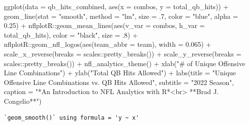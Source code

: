 \documentclass[
  letterpaper,
]{krantz}
\newenvironment{Shaded}{\begin{snugshade}}{\end{snugshade}}
\newcommand{\AttributeTok}[1]{\textcolor[rgb]{0.40,0.45,0.13}{#1}}
\newcommand{\DecValTok}[1]{\textcolor[rgb]{0.68,0.00,0.00}{#1}}
\newcommand{\FloatTok}[1]{\textcolor[rgb]{0.68,0.00,0.00}{#1}}
\newcommand{\FunctionTok}[1]{\textcolor[rgb]{0.28,0.35,0.67}{#1}}
\newcommand{\NormalTok}[1]{\textcolor[rgb]{0.00,0.23,0.31}{#1}}
\newcommand{\SpecialCharTok}[1]{\textcolor[rgb]{0.37,0.37,0.37}{#1}}
\newcommand{\StringTok}[1]{\textcolor[rgb]{0.13,0.47,0.30}{#1}}
\begin{document}
\begin{Shaded}
\begin{Highlighting}[]
\FunctionTok{ggplot}\NormalTok{(}\AttributeTok{data =}\NormalTok{ qb\_hits\_combined, }\FunctionTok{aes}\NormalTok{(}\AttributeTok{x =}\NormalTok{ combos, }\AttributeTok{y =}\NormalTok{ total\_qb\_hits)) }\SpecialCharTok{+}
    \FunctionTok{geom\_line}\NormalTok{(}\AttributeTok{stat =} \StringTok{"smooth"}\NormalTok{, }\AttributeTok{method =} \StringTok{"lm"}\NormalTok{,}
              \AttributeTok{size =}\NormalTok{ .}\DecValTok{7}\NormalTok{, }\AttributeTok{color =} \StringTok{"blue"}\NormalTok{,}
              \AttributeTok{alpha =} \FloatTok{0.25}\NormalTok{) }\SpecialCharTok{+}
\NormalTok{  nflplotR}\SpecialCharTok{::}\FunctionTok{geom\_mean\_lines}\NormalTok{(}\FunctionTok{aes}\NormalTok{(}\AttributeTok{v\_var =}\NormalTok{ combos, }\AttributeTok{h\_var =}\NormalTok{ total\_qb\_hits),}
                            \AttributeTok{color =} \StringTok{"black"}\NormalTok{, }\AttributeTok{size =}\NormalTok{ .}\DecValTok{8}\NormalTok{) }\SpecialCharTok{+}
\NormalTok{  nflplotR}\SpecialCharTok{::}\FunctionTok{geom\_nfl\_logos}\NormalTok{(}\FunctionTok{aes}\NormalTok{(}\AttributeTok{team\_abbr =}\NormalTok{ team), }\AttributeTok{width =} \FloatTok{0.065}\NormalTok{) }\SpecialCharTok{+}
  \FunctionTok{scale\_x\_reverse}\NormalTok{(}\AttributeTok{breaks =}\NormalTok{ scales}\SpecialCharTok{::}\FunctionTok{pretty\_breaks}\NormalTok{()) }\SpecialCharTok{+}
  \FunctionTok{scale\_y\_reverse}\NormalTok{(}\AttributeTok{breaks =}\NormalTok{ scales}\SpecialCharTok{::}\FunctionTok{pretty\_breaks}\NormalTok{()) }\SpecialCharTok{+}
  \FunctionTok{nfl\_analytics\_theme}\NormalTok{() }\SpecialCharTok{+}
  \FunctionTok{xlab}\NormalTok{(}\StringTok{"\# of Unique Offensive Line Combinations"}\NormalTok{) }\SpecialCharTok{+}
  \FunctionTok{ylab}\NormalTok{(}\StringTok{"Total QB Hits Allowed"}\NormalTok{) }\SpecialCharTok{+}
  \FunctionTok{labs}\NormalTok{(}\AttributeTok{title =} \StringTok{"Unique Offensive Line Combinations vs. QB Hits Allowed"}\NormalTok{,}
       \AttributeTok{subtitle =} \StringTok{"2022 Season"}\NormalTok{,}
       \AttributeTok{caption =} \StringTok{"*An Introduction to NFL Analytics with R*\textless{}br\textgreater{}}
\StringTok{       **Brad J. Congelio**"}\NormalTok{)}
\end{Highlighting}
\end{Shaded}

\begin{verbatim}
`geom_smooth()` using formula = 'y ~ x'
\end{verbatim}
\end{document}
